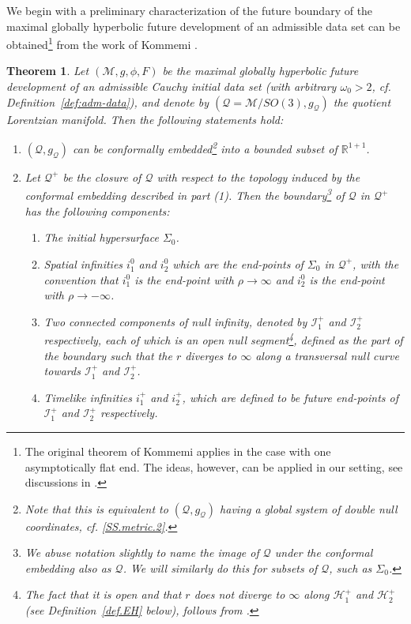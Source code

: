 \documentclass[10pt, reqno]{amsart}
\newtheorem{theorem}{Theorem}[section]
\theoremstyle{definition}
\theoremstyle{remark}
\numberwithin{equation}{section}
\newcommand{\0}{\emptyset}
\newcommand{\omg}{\omega}
\newcommand{\calH}{\mathcal H}
\newcommand{\calI}{\mathcal I}
\newcommand{\calM}{\mathcal M}
\newcommand{\calQ}{\mathcal Q}
\newcommand{\EH}{\calH^{+}}
\newcommand{\NI}{\calI^{+}}						%
\begin{document}
We begin with a preliminary characterization of the future boundary of the maximal globally hyperbolic future development of an admissible data set can be obtained\footnote{The original theorem of Kommemi applies in the case with one asymptotically flat end. The ideas, however, can be applied in our setting, see discussions in \cite{D3}.} from the work of Kommemi \cite{Kommemi}. 
\begin{theorem} \label{thm:kommemi}
Let $(\calM, g, \phi, F)$ be the maximal globally hyperbolic future development of an admissible Cauchy initial data set (with arbitrary $\omg_{0} >2$, cf. Definition~\ref{def:adm-data}), and denote by $(\calQ = \calM / SO(3), g_{\calQ})$ the quotient Lorentzian manifold. Then the following statements hold:
\begin{enumerate}
\item $(\mathcal Q,g_{\mathcal Q})$ can be conformally embedded\footnote{Note that this is equivalent to $(\mathcal Q,g_{\mathcal Q})$ having a global system of double null coordinates, cf. \eqref{SS.metric.2}.} into a bounded subset of $\mathbb R^{1+1}$. 
\item Let $\mathcal Q^+$ be the closure of $\mathcal Q$ with respect to the topology induced by the conformal embedding described in part (1). Then the boundary\footnote{We abuse notation slightly to name the image of $\mathcal Q$ under the conformal embedding also as $\mathcal Q$. We will similarly do this for subsets of $\mathcal Q$, such as $\Sigma_0$.} of $\mathcal Q$ in $\mathcal Q^+$ has the following components: 
\begin{enumerate}
\item The initial hypersurface $\Sigma_0$.
\item Spatial infinities $i^0_1$ and $i^0_2$ which are the end-points of $\Sigma_0$ in $\mathcal Q^+$, with the convention that $i^0_1$ is the end-point with $\rho\to \infty$ and $i^0_2$ is the end-point with $\rho\to -\infty$.
\item Two connected components of null infinity, denoted by $\mathcal I^+_1$ and $\mathcal I^+_2$ respectively, each of which is an open null segment\footnote{The fact that it is open and that $r$ does not diverge to $\infty$ along $\EH_1$ and $\EH_2$ (see Definition~\ref{def.EH} below), follows from \cite{DafTrapped}.}, defined as the part of the boundary such that the $r$ diverges to $\infty$ along a transversal null curve towards $\mathcal I^+_1$ and $\NI_2$. 
\item Timelike infinities $i^+_1$ and $i^+_2$, which are defined to be future end-points of $\mathcal I^+_1$ and $\mathcal I^+_2$ respectively.

\end{enumerate}
\end{enumerate}
\end{theorem}
\end{document}
